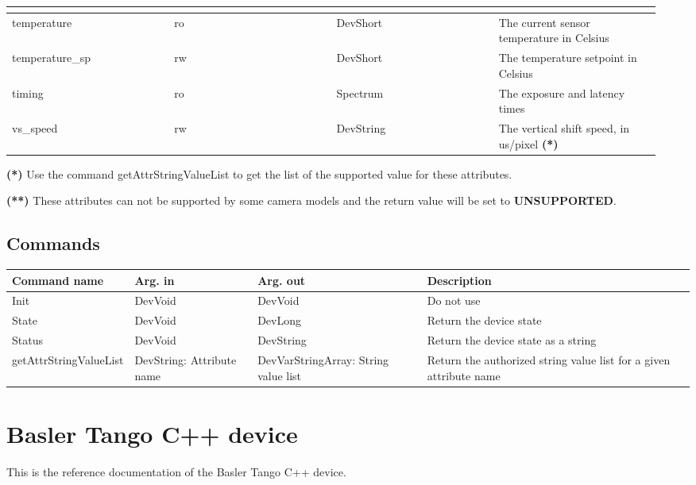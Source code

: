\documentclass[letterpaper,10pt,english]{sphinxmanual}
\begin{document}
\begin{tabular}{|p{0.237\linewidth}|p{0.237\linewidth}|p{0.237\linewidth}|p{0.237\linewidth}|}
\begin{description}
\begin{itemize}
\end{itemize}

\end{description}
\\
\hline
temperature
 & 
ro
 & 
DevShort
 & 
The current sensor temperature in Celsius
\\
\hline
temperature\_sp
 & 
rw
 & 
DevShort
 & 
The temperature setpoint in Celsius
\\
\hline
timing
 & 
ro
 & 
Spectrum
 & 
The exposure and latency times
\\
\hline
vs\_speed
 & 
rw
 & 
DevString
 & 
The vertical shift speed, in us/pixel \textbf{(*)}
\\
\hline\end{tabular}


\textbf{(*)} Use the command getAttrStringValueList to get the list of the supported value for these attributes.

\textbf{(**)} These attributes can not be supported by some camera models and the return value will be set to  \textbf{UNSUPPORTED}.


\section{Commands}
\label{AviexCCD/aviexccd:commands}
\begin{tabulary}{\linewidth}{|L|L|L|L|}
\hline
\textsf{\relax 
Command name
} & \textsf{\relax 
Arg. in
} & \textsf{\relax 
Arg. out
} & \textsf{\relax 
Description
}\\
\hline
Init
 & 
DevVoid
 & 
DevVoid
 & 
Do not use
\\
\hline
State
 & 
DevVoid
 & 
DevLong
 & 
Return the device state
\\
\hline
Status
 & 
DevVoid
 & 
DevString
 & 
Return the device state as a string
\\
\hline
getAttrStringValueList
 & 
DevString:
Attribute name
 & 
DevVarStringArray:
String value list
 & 
Return the authorized string value list for
a given attribute name
\\
\hline\end{tabulary}



\chapter{Basler Tango C++ device}
\label{BaslerCCD/baslerccd:lima-tango-basler}\label{BaslerCCD/baslerccd:basler-tango-c-device}\label{BaslerCCD/baslerccd::doc}
This is the reference documentation of the Basler Tango C++ device.
\end{document}
